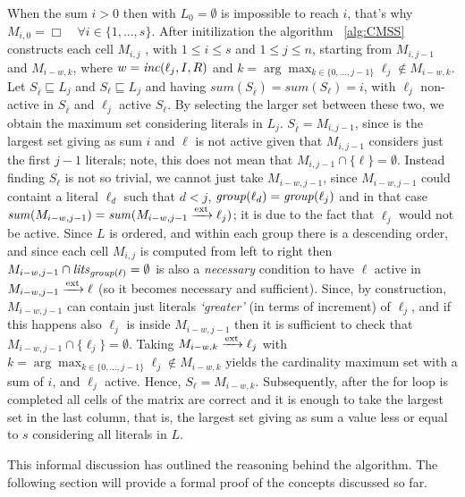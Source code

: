 When the sum $ i > 0$ then with $L_0 = \emptyset$ is impossible to reach $i$, 
that's why $M_{i,0} = \Box \quad \forall i \in \{1, \hdots , s\}$.
After initilization the algorithm ~\ref{alg:CMSS} constructs each cell $M_{i,j}$
, with $ 1 \le i \le s$ and $1 \le j \le n$, starting from $M_{i,j-1}$ and $M_{i-w,k}$,
where $w = \mathit{inc}(\ell_j,I,R)$ and $k = \arg \max_{k \in \{0,\hdots,j-1\}} \ell_j \not\in M_{i-w,k}$.
Let $S_{\overline{\ell}} \sqsubseteq L_j $ and $S_{\ell} \sqsubseteq L_j$ and having 
$\mathit{sum}(S_{\overline{\ell}}) = \mathit{sum}(S_{\ell}) = i$, with \(\ell_j\) 
non-active in $S_{\overline{\ell}}$ and \(\ell_j\) active $S_{\ell}$. 
By selecting the larger set between these two, 
we obtain the maximum set considering literals in $L_j$.
$S_{\overline{\ell}} = M_{i,j-1}$, since is the largest set giving as sum $i$
and $\ell$ is not active given that $M_{i,j-1}$ considers just the first $j-1$ literals;
note, this does not mean that $M_{i,j-1} \cap \{\ell\} = \emptyset$.
Instead finding $S_{\ell}$ is not so trivial, we cannot just take $M_{i-w,j-1}$,
since $M_{i-w,j-1}$ could containt a literal $\ell_d$ such that $d < j$,
$\mathit{group}(\ell_d) = \mathit{group}(\ell_j)$ and in that case 
$\mathit{sum}(M_{i-w,j-1}) = \mathit{sum}(M_{i-w,j-1} \xrightarrow{\text{ext}} \ell_j)$;
it is due to the fact that $\ell_j$ would not be active.
Since $L$ is ordered, and within each group there is a descending order, and since each 
cell $M_{i,j}$ is computed from left to right
then $M_{i-w,j-1} \cap \mathit{lits}_{\mathit{group}(\ell)} = \emptyset$ is also a \textit{necessary}
condition to have $\ell$
active in $M_{i-w,j-1} \xrightarrow{\text{ext}} \ell$
(so it becomes necessary and sufficient).
Since, by construction, $M_{i-w,j-1}$ can contain just literals \textit{`greater'} (in terms of 
increment) of $\ell_j$, and if this happens also $\ell_j$ is inside $M_{i-w,j-1}$ then 
it is sufficient to check that $M_{i-w,j-1} \cap \{\ell_j\} = \emptyset$.
Taking $M_{i-w,k} \xrightarrow{\text{ext}} \ell_j$ with $k = \arg \max_{k \in \{0,\hdots,j-1\}} \ell_j \not\in M_{i-w,k}$ 
yields the cardinality maximum set with a sum of \( i \), and \(\ell_j\) active.
Hence, $S_{\ell} = M_{i-w,k}$.
Subsequently, after the for loop is completed all cells of the matrix are correct 
and it is enough to take the largest set in the last column, that is, the 
largest set giving as sum a value less or equal to $s$ considering all literals in $L$.

This informal discussion has outlined the reasoning behind the algorithm. 
The following section will provide a formal proof of the concepts discussed
so far.

